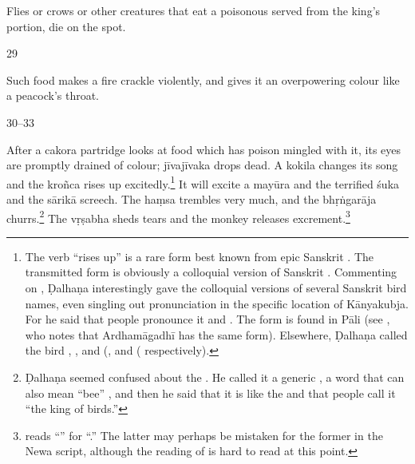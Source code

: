 \begin{translation}
\newcommand\animal[4]{\se{#2}{#1}} 
\let\bird=\animal 

Flies or crows or other creatures that eat 
a poisonous  served 
from the king's portion, die on the spot. 

\item [29] 

Such food makes a fire crackle violently, and gives it an
overpowering colour like a peacock's throat.

\item[30--33]


After a \gls{cakora} partridge looks at food which has poison
mingled with it, its eyes are promptly drained of colour;
\gls{jīvajīvaka} drops dead.  A \gls{kokila} changes its song and the
\gls{kroñca} rises up excitedly.\footnote{The verb 
    “rises up” is a rare form best known from epic Sanskrit
    \citep[see][212, \S 7.6.1]{ober-2003}.   The transmitted form
     is obviously a colloquial version of Sanskrit
    .  Commenting on , Ḍalhaṇa interestingly
    gave the colloquial versions of several Sanskrit bird names, even
    singling out pronunciation in the specific location of Kānyakubja. 
    For  he said that people pronounce it  and
    .  The form  is found in Pāli (see
    \cite[731]{cone-dict}, who notes that Ardhamāgadhī has the same
    form). Elsewhere, Ḍalhaṇa called the bird , 
    , and  (,
     and ( respectively).}  It will
    excite a \gls{mayūra} 
    and the terrified \gls{śuka}
    and the \gls{sārikā}
    screech. The \gls{haṃsa}
        trembles very much, and the \gls{bhṛṅgarāja}
    churrs.\footnote{Ḍalhaṇa seemed confused about the
        .  He called it a generic
        , a word that can also mean “bee”
        \citep[62]{dave}, and then he said that it is like the
         \citep[for a nice explanation of this
        name, see][62--63]{dave} and that people call it “the king of
        birds.”} The \gls{vṛṣabha}
        sheds tears and the monkey releases
        excrement.\footnote{ reads
            “” for “.”  The latter
            may perhaps be mistaken for the former in the Newa script, although
            the reading of  is hard to read at this
            point.}


\end{translation}
